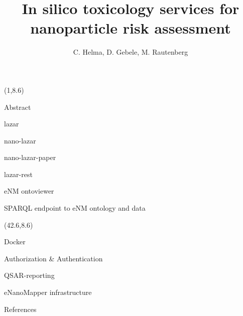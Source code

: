 \documentclass[final]{beamer}
\title{In silico toxicology services for nanoparticle risk assessment}
\author{C. Helma, D. Gebele, M. Rautenberg}
\institute{\emph{in silico} toxicology gmbh, Basel, Switzerland}
\begin{document}
  \begin{frame}{}

    \begin{textblock}{40.5}(1,8.6)
      \begin{block}{Abstract}
        
      \end{block}

      \begin{block}{lazar}
        
      \end{block}

      \begin{block}{nano-lazar}
        
      \end{block}

      \begin{block}{nano-lazar-paper}
        
      \end{block}

      \begin{block}{lazar-rest}
        
      \end{block}

      \begin{block}{eNM ontoviewer}
        
      \end{block}

      \begin{block}{SPARQL endpoint to eNM ontology and data}
        
      \end{block}


    \end{textblock}

    \begin{textblock}{40.5}(42.6,8.6)

      \begin{block}{Docker}
        
      \end{block}

      \begin{block}{Authorization \& Authentication}
        
      \end{block}

      \begin{block}{QSAR-reporting}
        
      \end{block}

      \begin{block}{eNanoMapper infrastructure}
        
      \end{block}

      \begin{block}{References}
        \small
      \end{block}

    \end{textblock}

  \end{frame}
\end{document}
